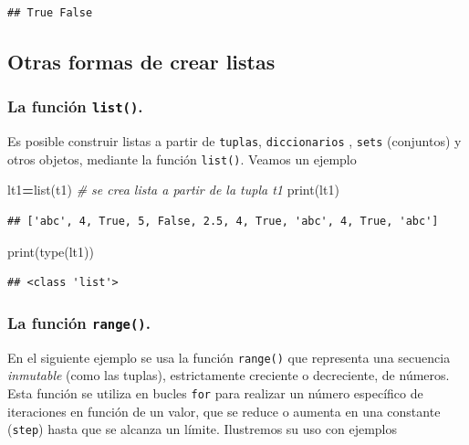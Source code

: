 \documentclass[
]{book}
\newenvironment{Shaded}{\begin{snugshade}}{\end{snugshade}}
\newcommand{\BuiltInTok}[1]{#1}
\newcommand{\CommentTok}[1]{\textcolor[rgb]{0.56,0.35,0.01}{\textit{#1}}}
\newcommand{\NormalTok}[1]{#1}
\newcommand{\OperatorTok}[1]{\textcolor[rgb]{0.81,0.36,0.00}{\textbf{#1}}}
\theoremstyle{definition}
\theoremstyle{definition}
\theoremstyle{definition}
\theoremstyle{definition}
\theoremstyle{remark}
\begin{document}
\begin{verbatim}
## True False
\end{verbatim}

\hypertarget{otras-formas-de-crear-listas}{%
\subsection{Otras formas de crear listas}\label{otras-formas-de-crear-listas}}

\hypertarget{la-funciuxf3n-list.}{%
\subsubsection{\texorpdfstring{La función \texttt{list()}.}{La función list().}}\label{la-funciuxf3n-list.}}

Es posible construir listas a partir de \texttt{tuplas}, \texttt{diccionarios} , \texttt{sets} (conjuntos) y otros objetos, mediante la función \texttt{list()}. Veamos un ejemplo

\begin{Shaded}
\begin{Highlighting}[]
\NormalTok{lt1}\OperatorTok{=}\BuiltInTok{list}\NormalTok{(t1) }\CommentTok{\# se crea lista a partir de la tupla t1 }
\BuiltInTok{print}\NormalTok{(lt1)}
\end{Highlighting}
\end{Shaded}

\begin{verbatim}
## ['abc', 4, True, 5, False, 2.5, 4, True, 'abc', 4, True, 'abc']
\end{verbatim}

\begin{Shaded}
\begin{Highlighting}[]
\BuiltInTok{print}\NormalTok{(}\BuiltInTok{type}\NormalTok{(lt1)) }
\end{Highlighting}
\end{Shaded}

\begin{verbatim}
## <class 'list'>
\end{verbatim}

\hypertarget{la-funciuxf3n-range.}{%
\subsubsection{\texorpdfstring{La función \texttt{range()}.}{La función range().}}\label{la-funciuxf3n-range.}}

En el siguiente ejemplo se usa la función \texttt{range()} que representa una secuencia \emph{inmutable} (como las tuplas), estrictamente creciente o decreciente, de números. Esta función se utiliza en bucles \texttt{for} para realizar un número específico de iteraciones en función de un valor, que se reduce o aumenta en una constante (\texttt{step}) hasta que se alcanza un límite. Ilustremos su uso con ejemplos
\end{document}
